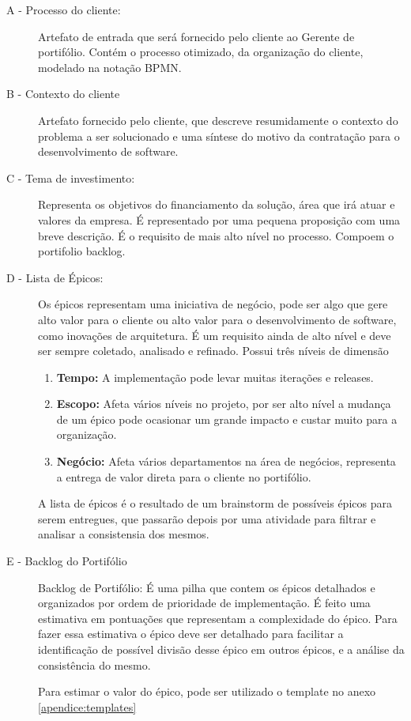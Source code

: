 \begin{description}
  \item[A - Processo do cliente:]
  Artefato de entrada que será fornecido pelo cliente ao Gerente de portifólio.
  Contém o processo otimizado, da organização do cliente, modelado na notação BPMN.\cite{BPMN}
  \item [B - Contexto do cliente]
  Artefato fornecido pelo cliente, que descreve resumidamente o contexto do problema
  a ser solucionado e uma síntese do motivo da contratação para o desenvolvimento de software.
  \item [C - Tema de investimento: ]
  Representa os objetivos do financiamento da solução, área que irá atuar e valores da empresa.
  É representado por uma pequena proposição com uma breve descrição. É o requisito de
  mais alto nível no processo. Compoem o portifolio backlog.\cite{themes}
  \item [D - Lista de Épicos:]
  Os épicos representam uma iniciativa de negócio, pode ser algo que gere alto valor
  para o cliente ou alto valor para o desenvolvimento de software, como inovações de arquitetura.
  É um requisito ainda de alto nível e deve ser sempre coletado, analisado e refinado.
  Possui três níveis de dimensão
    \begin{enumerate}
      \item \textbf{Tempo: } A implementação pode levar muitas iterações e releases.
      \item \textbf{Escopo: } Afeta vários níveis no projeto, por ser alto nível a mudança
      de um épico pode ocasionar um grande impacto e custar muito para a organização.
      \item \textbf{Negócio: } Afeta vários departamentos na área de negócios, representa
      a entrega de valor direta para o cliente no portifólio.
    \end{enumerate}
  A lista de épicos é o resultado de um brainstorm de possíveis épicos para serem entregues,
  que passarão depois por uma atividade para filtrar e analisar a consistensia dos mesmos.
  \item [E - Backlog do Portifólio]
  Backlog de Portifólio: É uma pilha que contem os épicos detalhados e organizados
  por ordem de prioridade de implementação. É feito uma estimativa em pontuações
  que representam a complexidade do épico. Para fazer essa estimativa o épico deve
  ser detalhado para facilitar a identificação de possível divisão desse épico em
  outros épicos, e a análise da consistência do mesmo.\cite{epics}

  Para estimar o valor do épico, pode ser utilizado o template no anexo \ref{apendice:templates}
\end{description}

